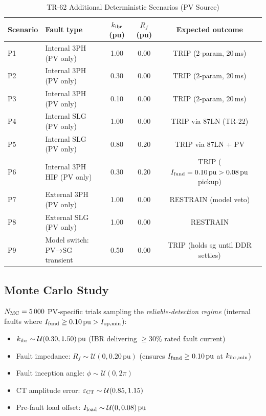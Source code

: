 \documentclass[11pt, a4paper]{article}
\newcommand{\pu}{\,\text{pu}}
\newcommand{\kIBR}{k_{\rm ibr}}
\begin{document}
\begin{table}[!t]
\centering
\caption{TR-62 Additional Deterministic Scenarios (PV Source)}
\label{tab:pv_scenarios}
\renewcommand{\arraystretch}{1.10}
\begin{tabular}{llccc}
\toprule
Scenario & Fault type & $\kIBR$ (pu) & $R_f$ (pu) & Expected outcome \\
\midrule
P1 & Internal 3PH (PV only)      & 1.00 & 0.00 & TRIP (2-param, 20\,ms) \\
P2 & Internal 3PH (PV only)      & 0.30 & 0.00 & TRIP (2-param, 20\,ms) \\
P3 & Internal 3PH (PV only)      & 0.10 & 0.00 & TRIP (2-param, 20\,ms) \\
P4 & Internal SLG (PV only)      & 1.00 & 0.00 & TRIP via 87LN (TR-22) \\
P5 & Internal SLG (PV only)      & 0.80 & 0.20 & TRIP via 87LN + PV \\
P6 & Internal 3PH HIF (PV only)  & 0.30 & 0.20 & TRIP ($I_{\rm fund}=0.10\pu > 0.08\pu$ pickup) \\
P7 & External 3PH (PV only)      & 1.00 & 0.00 & RESTRAIN (model veto) \\
P8 & External SLG (PV only)      & 1.00 & 0.00 & RESTRAIN \\
P9 & Model switch: PV→SG transient & 0.50 & 0.00 & TRIP (holds sg until DDR settles) \\
\bottomrule
\end{tabular}
\end{table}

\subsection{Monte Carlo Study}

$N_{\rm MC} = 5\,000$ PV-specific trials sampling the \emph{reliable-detection regime}
(internal faults where $I_{\rm fund} \geq 0.10\pu > I_{\rm op,min}$):
\begin{itemize}
  \item $\kIBR \sim \mathcal{U}(0.30, 1.50)\pu$ (IBR delivering $\geq 30\%$ rated fault current)
  \item Fault impedance: $R_f \sim \mathcal{U}(0, 0.20\pu)$ (ensures $I_{\rm fund} \geq 0.10\pu$ at $k_{\rm ibr,min}$)
  \item Fault inception angle: $\phi \sim \mathcal{U}(0, 2\pi)$
  \item CT amplitude error: $\varepsilon_{\rm CT} \sim \mathcal{U}(0.85, 1.15)$
  \item Pre-fault load offset: $I_{\rm load} \sim \mathcal{U}(0, 0.08)\pu$
\end{itemize}
\end{document}
